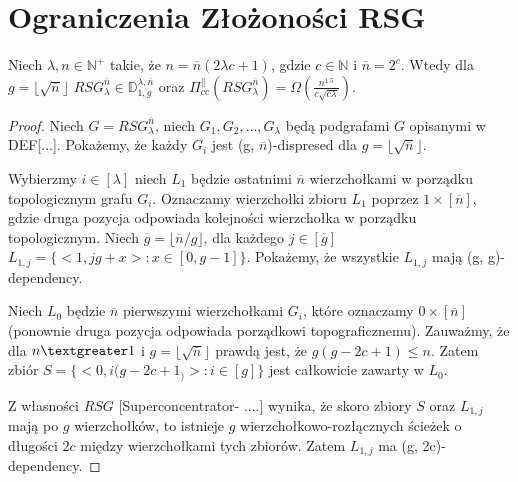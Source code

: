 \section{Ograniczenia Złożoności RSG}

\begin{theorem}
	Niech $ \lambda, n \in \mathbb{N}^{+}$ takie, że $n = \overline{n}(2 \lambda c + 1) $, gdzie $c \in \mathbb{N}$ i $ \overline{n} = 2^{c}$.
	Wtedy dla $ g = \lfloor \sqrt{ \overline{n}} \rfloor$
	$ RSG_{\lambda}^{ \overline{n}} \in \mathbb{D}_{1,g}^{\lambda, \overline{n}} $
	oraz
	$ \Pi_{cc}^{ \parallel }(RSG_{\lambda}^{\overline{n}}) = \Omega \left( \frac{n^{1.5}}{c \sqrt{c \lambda}} \right) $.
\end{theorem}

\begin{proof}
	Niech $G = RSG_{\lambda}^{ \overline{n}}$, niech $G_{1}, G_{2}, \dots , G_{ \lambda }$ będą
	podgrafami $G$ opisanymi w DEF[...].
	Pokażemy, że każdy $G_{i}$ jest (g, $\overline{n}$)-dispresed dla $g = \lfloor \sqrt{ \overline{n}} \rfloor $.
	
	Wybierzmy $i \in [ \lambda ]$ niech $L_{1}$ będzie ostatnimi $\overline{n}$ wierzchołkami w porządku topologicznym grafu $G_{i}$.
	Oznaczamy wierzchołki zbioru $L_{1}$ poprzez ${1} \times [ \overline{n} ]$, gdzie druga pozycja odpowiada kolejności wierzchołka w porządku topologicznym.
	Niech $ \overline{g} = \lfloor \overline{n} / g \rfloor$, dla każdego $j \in [ \overline{g}]$
	$L_{1, j} = \{ <1, jg + x> : x \in [0, g-1] \}$.
	Pokażemy, że wszystkie $L_{1, j}$ mają (g, g)-dependency.
	
	Niech $L_{0}$ będzie $\overline{n}$ pierwszymi wierzchołkami $G_{i}$, które oznaczamy ${0} \times [\overline{n}]$ (ponownie druga pozycja odpowiada porządkowi topograficznemu).
	Zauważmy, że dla $n \textgreater 1$ i $g = \lfloor \sqrt{ \overline{n}} \rfloor$ prawdą jest, że $g(g - 2c + 1) \leq n$.
	Zatem zbiór $S = \{ <0, i(g - 2c + 1_)>: i \in [g] \}$ jest całkowicie zawarty w $L_{0}$.
	
	Z własności $RSG$ [Superconcentrator- ....] wynika, że skoro zbiory $S$ oraz $L_{1,j}$ mają po $g$ wierzchołków, to istnieje $g$ wierzchołkowo-rozłącznych ścieżek o długości $2c$ między wierzchołkami tych zbiorów. Zatem $L_{1,j}$ ma (g, 2c)-dependency.
	

\end{proof}
